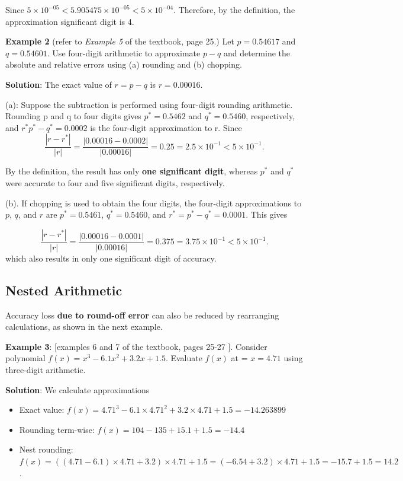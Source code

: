 \documentclass[
]{book}
\begin{document}
Since \(5\times 10^{-05} < 5.905475\times 10^{-05} < 5\times 10^{-04}\). Therefore, by the definition, the approximation significant digit is 4.

\textbf{Example 2} (refer to \emph{Example 5} of the textbook, page 25.) Let \(p=0.54617\) and \(q=0.54601\). Use four-digit arithmetic to approximate \(p - q\) and determine the absolute and relative errors using (a) rounding and (b) chopping.

\textbf{Solution}: The exact value of \(r = p - q\) is \(r = 0.00016\).

(a): Suppose the subtraction is performed using four-digit rounding arithmetic. Rounding p and q to four digits gives \(p^* = 0.5462\) and \(q^* = 0.5460\), respectively, and \(r^* p^* - q^* = 0.0002\) is the four-digit approximation to r. Since
\[
\frac{|r - r^*|}{|r|} = \frac{|0.00016 - 0.0002|}{|0.00016|} = 0.25 = 2.5\times 10^{-1} < 5\times 10^{-1}.
\]

By the definition, the result has only \textbf{\color{red}one significant digit}, whereas \(p^*\) and \(q^*\) were accurate to four and five significant digits, respectively.

(b). If chopping is used to obtain the four digits, the four-digit approximations to \(p\), \(q\), and \(r\) are \(p^* = 0.5461\), \(q^* = 0.5460\), and \(r^* = p^* - q^* = 0.0001\). This gives

\[
\frac{|r - r^*|}{|r|} = \frac{|0.00016 - 0.0001|}{|0.00016|} = 0.375 = 3.75\times 10^{-1} < 5\times 10^{-1}.
\]
which also results in only one significant digit of accuracy.

\hypertarget{nested-arithmetic}{%
\subsection{Nested Arithmetic}\label{nested-arithmetic}}

Accuracy loss \textbf{due to round-off error} can also be reduced by rearranging calculations, as shown in the next example.

\textbf{Example 3}: {[}examples 6 and 7 of the textbook, pages 25-27 {]}. Consider polynomial \(f(x) = x^3 - 6.1x^2 + 3.2x + 1.5\). Evaluate \(f(x)\) at = \(x = 4.71\) using three-digit arithmetic.

\textbf{Solution}: We calculate approximations

\begin{itemize}
\item
  Exact value: \(f(x) = 4.71^3 - 6.1\times 4.71^2 + 3.2\times 4.71 + 1.5 = -14.263899\)
\item
  Rounding term-wise: \(f(x) = 104 - 135 + 15.1 + 1.5 = -14.4\)
\item
  Nest rounding: \(f(x) = ((4.71 - 6.1)\times 4.71 + 3.2)\times 4.71 + 1.5=(-6.54+3.2)\times4.71+1.5 = -15.7+1.5 = 14.2\).
\end{itemize}
\end{document}
